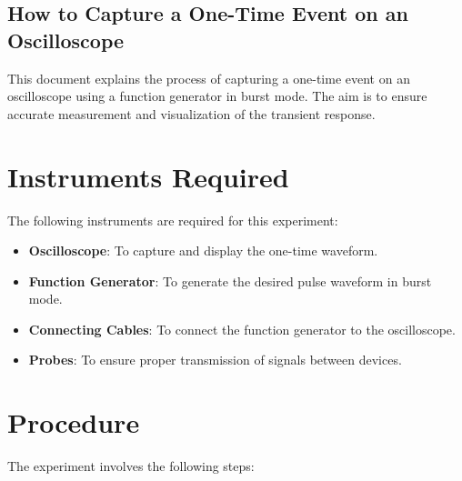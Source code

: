 \documentclass[12pt]{article}
\begin{document}
\subsection{How to Capture a One-Time Event on an Oscilloscope}

This document explains the process of capturing a one-time event on an oscilloscope using a function generator in burst mode. The aim is to ensure accurate measurement and visualization of the transient response.
\section*{Instruments Required}
The following instruments are required for this experiment:
\begin{itemize}
    \item \textbf{Oscilloscope}: To capture and display the one-time waveform.
    \item \textbf{Function Generator}: To generate the desired pulse waveform in burst mode.
    \item \textbf{Connecting Cables}: To connect the function generator to the oscilloscope.
    \item \textbf{Probes}: To ensure proper transmission of signals between devices.
\end{itemize}
\section*{Procedure}
The experiment involves the following steps:
\end{document}
